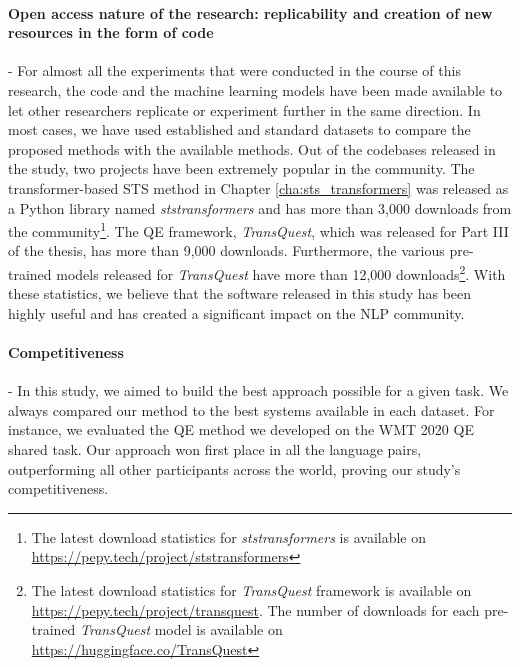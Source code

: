 \paragraph{Open access nature of the research: replicability and creation of new resources in the form of code} - For almost all the experiments that were conducted in the course of this research, the code and the machine learning models have been made available to let other researchers replicate or experiment further in the same direction. In most cases, we have used established and standard datasets to compare the proposed methods with the available methods. Out of the codebases released in the study, two projects have been extremely popular in the community. The transformer-based STS method in Chapter \ref{cha:sts_transformers} was released as a Python library named \textit{ststransformers} and has more than 3,000 downloads from the community\footnote{The latest download statistics for \textit{ststransformers} is available on \url{https://pepy.tech/project/ststransformers}}. The QE framework, \textit{TransQuest}, which was released for Part III of the thesis, has more than 9,000 downloads. Furthermore, the various pre-trained models released for \textit{TransQuest} have more than 12,000 downloads\footnote{The latest download statistics for \textit{TransQuest} framework is available on \url{https://pepy.tech/project/transquest}. The number of downloads for each pre-trained \textit{TransQuest} model is available on \url{https://huggingface.co/TransQuest}}. With these statistics, we believe that the software released in this study has been highly useful and has created a significant impact on the NLP community.

\paragraph{Competitiveness} - In this study, we aimed to build the best approach possible for a given task. We always compared our method to the best systems available in each dataset. For instance, we evaluated the QE method we developed on the WMT 2020 QE shared task. Our approach won first place in all the language pairs, outperforming all other participants across the world, proving our study's competitiveness.



